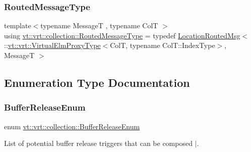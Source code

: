 \mbox{\label{namespacevt_1_1vrt_1_1collection_a1bbc628be0955797f2d45227ee526346}} 
\subsubsection{\texorpdfstring{Routed\+Message\+Type}{RoutedMessageType}}
{\footnotesize\ttfamily template$<$typename MessageT , typename ColT $>$ \\
using \hyperlink{namespacevt_1_1vrt_1_1collection_a1bbc628be0955797f2d45227ee526346}{vt\+::vrt\+::collection\+::\+Routed\+Message\+Type} = typedef \hyperlink{namespacevt_a0cb65f2151629893480ef391def4e733}{Location\+Routed\+Msg}$<$ \+::\hyperlink{namespacevt_1_1vrt_a620a5c8c59d13e513f690c74b4af516f}{vt\+::vrt\+::\+Virtual\+Elm\+Proxy\+Type}$<$ColT, typename Col\+T\+::\+Index\+Type$>$, MessageT $>$}



\subsection{Enumeration Type Documentation}
\mbox{\label{namespacevt_1_1vrt_1_1collection_a2545006e681bacc1f00be9d5d6bdc8fa}} 
\subsubsection{\texorpdfstring{Buffer\+Release\+Enum}{BufferReleaseEnum}}
{\footnotesize\ttfamily enum \hyperlink{namespacevt_1_1vrt_1_1collection_a2545006e681bacc1f00be9d5d6bdc8fa}{vt\+::vrt\+::collection\+::\+Buffer\+Release\+Enum}}



List of potential buffer release triggers that can be composed $\vert$. 

